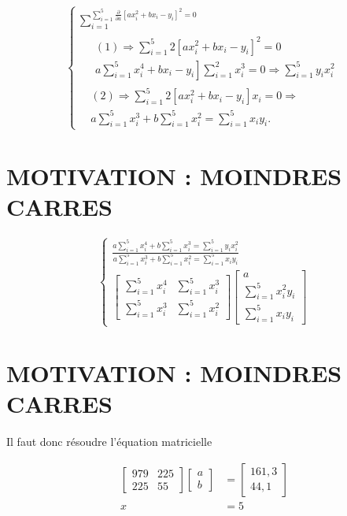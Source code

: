 \documentclass[10pt]{article}
\begin{document}
\[
\left\{\begin{array}{l}
\sum_{i=1}^{\sum_{i=1}^{5} \frac{\partial}{\partial a}\left[a x_{i}^{2}+b x_{i}-y_{i}\right]^{2}=0} \\
\quad \begin{array}{l}
(1) \Rightarrow \sum_{i=1}^{5} 2\left[a x_{i}^{2}+b x_{i}-y_{i}\right]^{2}=0 \\
\left.a \sum_{i=1}^{5} x_{i}^{4}+b x_{i}-y_{i}\right] \sum_{i=1}^{2} x_{i}^{3}=0 \Rightarrow \sum_{i=1}^{5} y_{i} x_{i}^{2}
\end{array} \\
\quad(2) \Rightarrow \sum_{i=1}^{5} 2\left[a x_{i}^{2}+b x_{i}-y_{i}\right] x_{i}=0 \Rightarrow \\
\quad a \sum_{i=1}^{5} x_{i}^{3}+b \sum_{i=1}^{5} x_{i}^{2}=\sum_{i=1}^{5} x_{i} y_{i} .
\end{array}\right.
\]

\section*{MOTIVATION : MOINDRES CARRES}
\[
\left\{\begin{array}{l}
\frac{a \sum_{i=1}^{5} x_{i}^{4}+b \sum_{i=1}^{5} x_{i}^{3}=\sum_{i=1}^{5} y_{i} x_{i}^{2}}{a \sum_{i=1}^{5} x_{i}^{3}+b \sum_{i=1}^{5} x_{i}^{2}=\sum_{i=1}^{5} x_{i} y_{i}} \\
{\left[\begin{array}{ll}
\sum_{i=1}^{5} x_{i}^{4} & \sum_{i=1}^{5} x_{i}^{3} \\
\sum_{i=1}^{5} x_{i}^{3} & \sum_{i=1}^{5} x_{i}^{2}
\end{array}\right]\left[\begin{array}{l}
a \\
\sum_{i=1}^{5} x_{i}^{2} y_{i} \\
\sum_{i=1}^{5} x_{i} y_{i}
\end{array}\right]}
\end{array}\right.
\]

\section*{MOTIVATION : MOINDRES CARRES}
Il faut donc résoudre l'équation matricielle

\[
\begin{aligned}
{\left[\begin{array}{ll}
979 & 225 \\
225 & 55
\end{array}\right]\left[\begin{array}{l}
a \\
b
\end{array}\right] } & =\left[\begin{array}{c}
161,3 \\
44,1
\end{array}\right] \\
x & =5
\end{aligned}
\]
\end{document}
